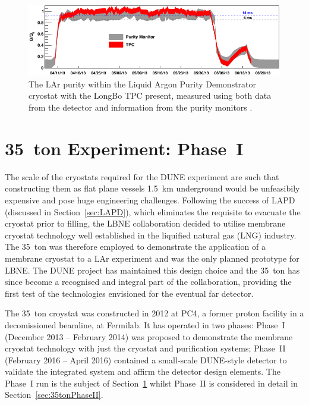 \begin{figure}
  \centering
  \includegraphics[width=14cm]{LongBoPurity.pdf}
  \caption[The LAr purity within the Liquid Argon Purity Demonstrator cryostat with the LongBo TPC present, measured using both data from the detector and information from the purity monitors.]{The LAr purity within the Liquid Argon Purity Demonstrator cryostat with the LongBo TPC present, measured using both data from the detector and information from the purity monitors \cite{LongBo2015}.}
  \label{fig:LongBoPurity}
\end{figure}

\section{35~ton Experiment: Phase~I}\label{sec:35tonPhaseI}

The scale of the cryostats required for the DUNE experiment are such that constructing them as flat plane vessels 1.5~km underground would be unfeasibily expensive and pose huge engineering challenges.  Following the success of LAPD (discussed in Section~\ref{sec:LAPD}), which eliminates the requisite to evacuate the cryostat prior to filling, the LBNE collaboration decided to utilise membrane cryostat technology well established in the liquified natural gas (LNG) industry.  The 35~ton \cite{35tonPhaseI2014Cryostat,35tonPhaseI2014,35tonPhaseI2015} was therefore employed to demonstrate the application of a membrane cryostat to a LAr experiment and was the only planned prototype for LBNE.  The DUNE project has maintained this design choice and the 35~ton has since become a recognised and integral part of the collaboration, providing the first test of the technologies envisioned for the eventual far detector.

The 35~ton croystat was constructed in 2012 at PC4, a former proton facility in a decomissioned beamline, at Fermilab.  It has operated in two phases: Phase~I (December 2013 -- February 2014) was proposed to demonstrate the membrane cryostat technology with just the cryostat and purification systems; Phase~II (February 2016 -- April 2016) contained a small-scale DUNE-style detector to validate the integrated system and affirm the detector design elements.  The Phase~I run is the subject of Section~\ref{sec:35tonPhaseI} whilst Phase~II is considered in detail in Section~\ref{sec:35tonPhaseII}.

